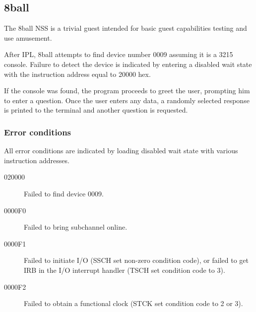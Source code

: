 \subsection{8ball}
The 8ball NSS is a trivial guest intended for basic guest capabilities
testing and use amusement.

After IPL, 8ball attempts to find device number \mbox{0009} assuming it is a
3215 console.  Failure to detect the device is indicated by entering a
disabled wait state with the instruction address equal to 20000 hex.

If the console was found, the program proceeds to greet the user, prompting
him to enter a question.  Once the user enters any data, a randomly selected
response is printed to the terminal and another question is requested.

\subsubsection*{Error conditions}
All error conditions are indicated by loading disabled wait state with
various instruction addresses.

\begin{description}
\item[020000] Failed to find device 0009.
\item[0000F0] Failed to bring subchannel online.
\item[0000F1] Failed to initiate I/O (SSCH set non-zero condition code), or
	failed to get IRB in the I/O interrupt handler (TSCH set condition
	code to 3).
\item[0000F2] Failed to obtain a functional clock (STCK set condition code to
	2 or 3).
\end{description}
